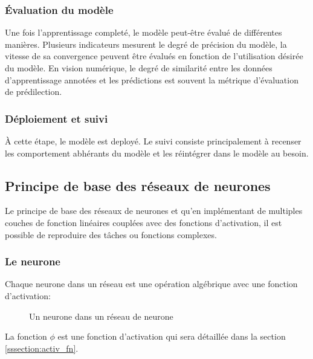     \subsubsection{Évaluation du modèle}
      Une fois l'apprentissage completé, le modèle peut-être évalué de différentes manières. Plusieurs indicateurs mesurent le degré de précision du modèle, la vitesse de sa convergence peuvent être évalués en fonction de l'utilisation désirée du modèle. En vision numérique, le degré de similarité entre les données d'apprentissage annotées et les prédictions est souvent la métrique d'évaluation de prédilection.
    \subsubsection{Déploiement et suivi}
      À cette étape, le modèle est deployé. Le suivi consiste principalement à recenser les comportement abhérants du modèle et les réintégrer dans le modèle au besoin. 
  \subsection{Principe de base des réseaux de neurones}
  Le principe de base des réseaux de neurones et qu'en implémentant de multiples couches de fonction linéaires couplées avec des fonctions d'activation, il est possible de reproduire des tâches ou fonctions complexes. 
    \subsubsection{Le neurone}
      Chaque neurone dans un réseau est une opération algébrique avec une fonction d'activation:

        \begin{figure}[!h]
          \centering
          \caption{Un neurone dans un réseau de neurone}
          \label{fig:neurone}
        \end{figure}
      La fonction $\phi $ est une fonction d'activation qui sera détaillée dans la section \ref{sssection:activ_fn}.
      \FloatBarrier
